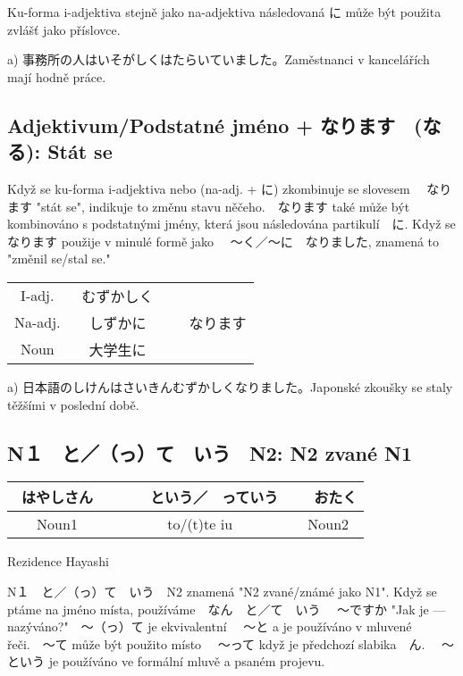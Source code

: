Ku-forma i-adjektiva  stejně jako na-adjektiva následovaná に může být použita zvlášť jako příslovce.

a) 事務所の人はいそがしくはたらいていました。Zaměstnanci v kancelářích mají hodně práce.


\subsection{Adjektivum/Podstatné jméno + なります　(なる): Stát se}

Když se ku-forma i-adjektiva nebo (na-adj. + に) zkombinuje se slovesem 　なります "stát se", indikuje to změnu stavu něčeho.　なります také může být kombinováno s podstatnými jmény, která jsou následována partikulí　に. Když se　なります použije v minulé formě jako 　〜く／〜に　なりました, znamená to "změnil se/stal se."

\begin{center}
\begin{tabular}{|c|c|c|}
\hline
I-adj. &むずかしく　&\\
Na-adj. &しずかに　&　なります\\
Noun &大学生に&\\
\hline
\end{tabular}
\end{center}

a) 日本語のしけんはさいきんむずかしくなりました。Japonské zkoušky se staly těžšími v poslední době.


\subsection{N１　と／（っ）て　いう　N2: N2 zvané N1}

\begin{center}
\begin{tabular}{|c|c|c|}
\hline
はやしさん　&　　という／　っていう　&　おたく\\
\hline
Noun1&to/(t)te iu& Noun2\\
\hline
\end{tabular}
\end{center}
Rezidence Hayashi


N１　と／（っ）て　いう　N2 znamená "N2 zvané/známé jako N1". Když se ptáme na jméno místa, používáme　なん　と／て　いう 　〜ですか "Jak je --- nazýváno?"　〜（っ）て je ekvivalentní 　〜と a je používáno v mluvené řeči.　〜て může být použito místo 　〜って když je předchozí slabika　ん. 　〜という je používáno ve formální mluvě a psaném projevu.

